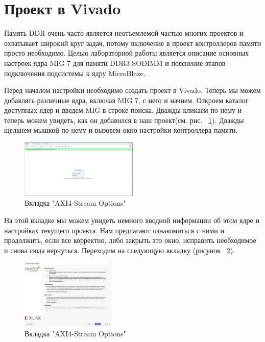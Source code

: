 \documentclass[a4paper,oneside ,10pt]{extreport}
\begin{document}
\section{Проект в Vivado}

Память DDR очень часто является неотъемлемой частью многих проектов и охватывает широкий круг задач, потому включение в проект контроллеров памяти просто необходимо.
Целью лабораторной работы является описание основных настроек ядра MIG 7 для памяти DDR3 SODIMM и пояснение этапов подключения подсистемы к ядру MicroBlaze.

Перед началом настройки необходимо создать проект в Vivado. Теперь мы можем добавлять различные ядра, включая MIG 7, с него и начнем. Откроем каталог доступных ядер и введем MIG в строке поиска. Дважды кликаем по нему и теперь можем увидеть, как он добавился в наш проект(см. рис. ~\ref{mig_0_2}). Дважды щелкнем мышкой по нему и вызовем окно настройки контроллера памяти.

\begin{figure}[h]
	\centering
	\includegraphics[width=0.5\textwidth]{image/mig_0_2.png}
	\caption{Вкладка "AXI4-Stream Options"}
	\label{mig_0_2}
\end{figure}

На этой вкладке мы можем увидеть немного вводной информации об этом ядре и настройках текущего проекта. Нам предлагают ознакомиться с ними и продолжить, если все корректно, либо закрыть это окно, исправить необходимое и снова сюда вернуться. Переходим на следующую вкладку (рисунок ~\ref{mig_1}).

\begin{figure}[h]
	\centering
	\includegraphics[width=0.4\textwidth]{image/mig_1.png}
	\caption{Вкладка "AXI4-Stream Options"}
	\label{mig_1}
\end{figure}
\end{document}
